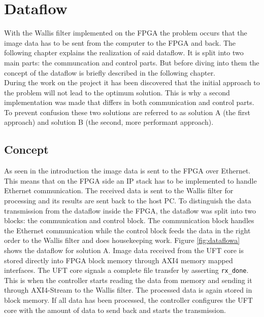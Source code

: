 %
%
\chapter{Dataflow} \label{chapt:dataflow}
With the Wallis filter implemented on the FPGA the problem occurs that the
image data has to be sent from the computer to the FPGA and back. The following
chapter explains the realization of said dataflow. It is split into two main
parts: the communcation and control parts. But before diving into them the
concept of the dataflow is briefly described in the following chapter.\\

During the work on the project it has been discovered that the initial approach
to
the problem will not lead to the optimum solution. This is why a second
implementation was made that differs in both communication and control parts. To
prevent confusion these two solutions are referred to as solution A (the first
approach) and solution B (the second, more performant approach).

\section{Concept} \label{ch:concept}
As seen in the introduction the image data is sent to the FPGA over Ethernet.
This means that on the FPGA side an IP stack has to be implemented to handle
Ethernet
communication. The received data is sent to the Wallis filter for
processing and its results are sent back to the host PC. To distinguish
the
data transmission from the dataflow inside the FPGA, the dataflow was split into
two blocks: the communication and control block. The communication block handles
the Ethernet communication while the control block feeds the data in the right
order to the Wallis filter and does housekeeping work. Figure \ref{fig:dataflowa}
shows the dataflow for solution A.
\clearpage
Image data received from the UFT core is stored directly into FPGA block memory
through AXI4 memory mapped interfaces. The UFT core signals a complete file
transfer by asserting \texttt{rx\_done}. This is when the controller starts
reading the data from memory and sending it through AXI4-Stream to the Wallis
filter. The processed data is again stored in block memory. If all data has been
processed, the controller configures the UFT core with the amount of data to
send back and starts the transmission.

